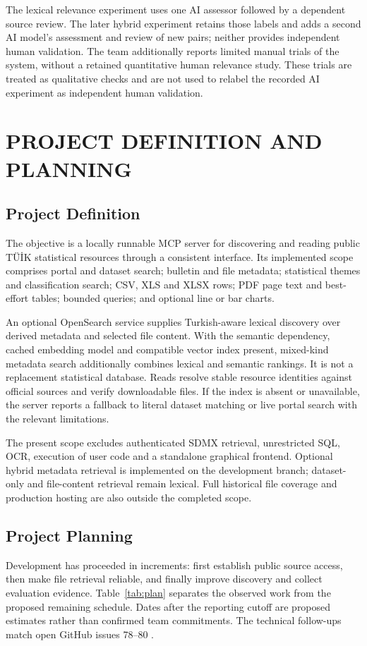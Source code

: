 \documentclass[a4paper,12pt]{report}
\newcommand{\tuik}{T\"U\.{I}K}
\begin{document}
The lexical relevance experiment uses one AI assessor followed by a dependent source review. The later hybrid experiment retains those labels and adds a second AI model's assessment and review of new pairs; neither provides independent human validation. The team additionally reports limited manual trials of the system, without a retained quantitative human relevance study. These trials are treated as qualitative checks and are not used to relabel the recorded AI experiment as independent human validation.

\chapter{PROJECT DEFINITION AND PLANNING}
\section{Project Definition}
The objective is a locally runnable MCP server for discovering and reading public \tuik{} statistical resources through a consistent interface. Its implemented scope comprises portal and dataset search; bulletin and file metadata; statistical themes and classification search; CSV, XLS and XLSX rows; PDF page text and best-effort tables; bounded queries; and optional line or bar charts.

An optional OpenSearch service supplies Turkish-aware lexical discovery over derived metadata and selected file content. With the semantic dependency, cached embedding model and compatible vector index present, mixed-kind metadata search additionally combines lexical and semantic rankings. It is not a replacement statistical database. Reads resolve stable resource identities against official sources and verify downloadable files. If the index is absent or unavailable, the server reports a fallback to literal dataset matching or live portal search with the relevant limitations.

The present scope excludes authenticated SDMX retrieval, unrestricted SQL, OCR, execution of user code and a standalone graphical frontend. Optional hybrid metadata retrieval is implemented on the development branch; dataset-only and file-content retrieval remain lexical. Full historical file coverage and production hosting are also outside the completed scope.

\section{Project Planning}
Development has proceeded in increments: first establish public source access, then make file retrieval reliable, and finally improve discovery and collect evaluation evidence. Table~\ref{tab:plan} separates the observed work from the proposed remaining schedule. Dates after the reporting cutoff are proposed estimates rather than confirmed team commitments. The technical follow-ups match open GitHub issues 78--80 \cite{remaining-issues}.
\end{document}
